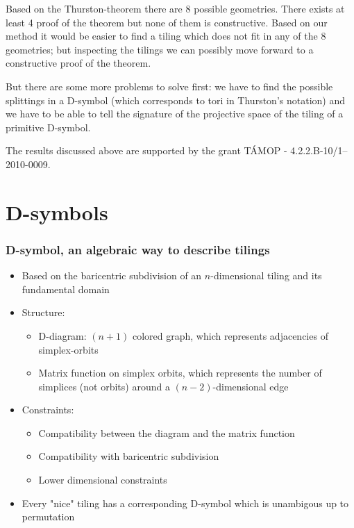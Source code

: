 \begin{frame}
Based on the Thurston-theorem there are 8 possible geometries.  There exists at
least 4 proof of the theorem but none of them is constructive. Based on our
method it would be easier to find a tiling which does not fit in any of the 8
geometries; but inspecting the tilings we can possibly move forward to a
constructive proof of the theorem.
\vfill

But there are some more problems to solve first: we have to find the possible
splittings in a D-symbol (which corresponds to tori in Thurston's notation)
and we have to be able to tell the signature of the projective space of the
tiling of a primitive D-symbol.
\vfill

The results discussed above are supported by the grant TÁMOP -
4.2.2.B-10/1--2010-0009.

\end{frame}

\section{D-symbols}
\begin{frame}
  \frametitle{D-symbol, an algebraic way to describe tilings}
  \begin{itemize}
    \item Based on the baricentric subdivision of an $n$-dimensional tiling and its fundamental
      domain 
    \item Structure:
      \begin{itemize}
        \item D-diagram: $(n+1)$ colored graph, which represents adjacencies of
          simplex-orbits
        \item Matrix function on simplex orbits, which represents the number of
          simplices (not orbits) around a $(n-2)$-dimensional edge
      \end{itemize}
    \item Constraints:
      \begin{itemize}
        \item Compatibility between the diagram and the matrix function
        \item Compatibility with baricentric subdivision
        \item Lower dimensional constraints
      \end{itemize}
    \item Every "nice" tiling has a corresponding D-symbol which is unambigous
      up to permutation 
  \end{itemize}
\end{frame}

